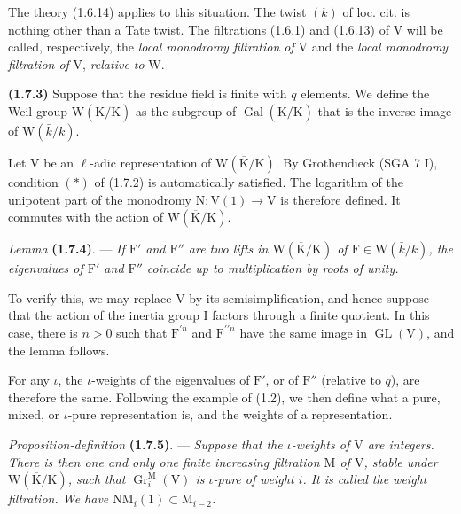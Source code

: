 \documentclass[11pt,leqno]{article}
\begin{document}
The theory  (1.6.14) applies to this situation. The twist \((k)\) of loc. cit. is nothing other than a Tate twist. The filtrations (1.6.1) and (1.6.13) of \(\mathrm{V}\) will be called, respectively, the \textit{local monodromy filtration of} \(\mathrm{V}\) and the \textit{local monodromy filtration of} \(\mathrm{V}\), \textit{relative to} \(\mathrm{W}\).

\textbf{(1.7.3)} Suppose that the residue field is finite with \(q\) elements. We define the Weil group \(\mathrm{W}(\overline{\mathrm{K}}/\mathrm{K})\) as the subgroup of \(\operatorname{Gal}(\overline{\mathrm{K}}/\mathrm{K})\) that is the inverse image of \(\mathrm{W}(\bar{k}/k)\).

Let \(\mathrm{V}\) be an \(\ell\)-adic representation of \(\mathrm{W}(\overline{\mathrm{K}}/\mathrm{K})\). By Grothendieck (SGA 7 I), condition \((*)\) of (1.7.2) is automatically satisfied. The logarithm of the unipotent part of the monodromy \(\mathrm{N}:\mathrm{V}(1)\to\mathrm{V}\) is therefore defined. It commutes with the action of \(\mathrm{W}(\overline{\mathrm{K}}/\mathrm{K})\).

\textit{Lemma} \textbf{(1.7.4)}. — \textit{If \(\mathrm{F}'\) and \(\mathrm{F}''\) are two lifts in \(\mathrm{W}(\overline{\mathrm{K}}/\mathrm{K})\) of \(\mathrm{F}\in\mathrm{W}(\bar{k}/k)\), the eigenvalues of \(\mathrm{F}'\) and \(\mathrm{F}''\) coincide up to multiplication by roots of unity.}

To verify this, we may replace \(\mathrm{V}\) by its semisimplification, and hence suppose that the action of the inertia group \(\mathrm{I}\) factors through a finite quotient. In this case, there is \(n>0\) such that \(\mathrm{F}^{\prime n}\) and \(\mathrm{F}^{\prime\prime n}\) have the same image in \(\operatorname{GL}(\mathrm{V})\), and the lemma follows.

For any \(\iota\), the \(\iota\)-weights of the eigenvalues of \(\mathrm{F}'\), or of \(\mathrm{F}''\) (relative to \(q\)), are therefore the same. Following the example of (1.2), we then define what a pure, mixed, or \(\iota\)-pure representation is, and the weights of a representation.

\textit{Proposition-definition} \textbf{(1.7.5)}. — \textit{Suppose that the \(\iota\)-weights of \(\mathrm{V}\) are integers. There is then one and only one finite increasing filtration \(\mathrm{M}\) of \(\mathrm{V}\), stable under \(\mathrm{W}(\overline{\mathrm{K}}/\mathrm{K})\), such that \(\operatorname{Gr}_i^{\mathrm{M}}(\mathrm{V})\) is \(\iota\)-pure of weight \(i\). It is called the \textup{weight filtration}. We have \(\mathrm{N}\mathrm{M}_i(1)\subset\mathrm{M}_{i-2}\).}
\end{document}
